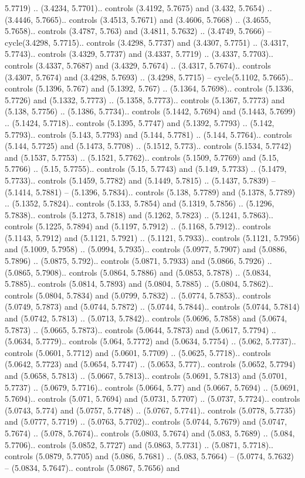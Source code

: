 5.7719) .. (3.4234, 5.7701).. controls (3.4192, 5.7675) and (3.432, 5.7654) .. (3.4446, 5.7665).. controls (3.4513, 5.7671) and (3.4606, 5.7668) .. (3.4655, 5.7658).. controls (3.4787, 5.763) and (3.4811, 5.7632) .. (3.4749, 5.7666) -- cycle(3.4298, 5.7715).. controls (3.4298, 5.7737) and (3.4307, 5.7751) .. (3.4317, 5.7743).. controls (3.4329, 5.7737) and (3.4337, 5.7719) .. (3.4337, 5.7703).. controls (3.4337, 5.7687) and (3.4329, 5.7674) .. (3.4317, 5.7674).. controls (3.4307, 5.7674) and (3.4298, 5.7693) .. (3.4298, 5.7715) -- cycle(5.1102, 5.7665).. controls (5.1396, 5.767) and (5.1392, 5.767) .. (5.1364, 5.7698).. controls (5.1336, 5.7726) and (5.1332, 5.7773) .. (5.1358, 5.7773).. controls (5.1367, 5.7773) and (5.138, 5.7756) .. (5.1386, 5.7734).. controls (5.1442, 5.7694) and (5.1443, 5.7699) .. (5.1424, 5.7718).. controls (5.1395, 5.7747) and (5.1392, 5.7793) .. (5.142, 5.7793).. controls (5.143, 5.7793) and (5.144, 5.7781) .. (5.144, 5.7764).. controls (5.144, 5.7725) and (5.1473, 5.7708) .. (5.1512, 5.773).. controls (5.1534, 5.7742) and (5.1537, 5.7753) .. (5.1521, 5.7762).. controls (5.1509, 5.7769) and (5.15, 5.7766) .. (5.15, 5.7755).. controls (5.15, 5.7743) and (5.149, 5.7733) .. (5.1479, 5.7733).. controls (5.1459, 5.7782) and (5.1449, 5.7815) .. (5.1437, 5.7839) -- (5.1414, 5.7881) -- (5.1396, 5.7834).. controls (5.138, 5.7789) and (5.1378, 5.7789) .. (5.1352, 5.7824).. controls (5.133, 5.7854) and (5.1319, 5.7856) .. (5.1296, 5.7838).. controls (5.1273, 5.7818) and (5.1262, 5.7823) .. (5.1241, 5.7863).. controls (5.1225, 5.7894) and (5.1197, 5.7912) .. (5.1168, 5.7912).. controls (5.1143, 5.7912) and (5.1121, 5.7921) .. (5.1121, 5.7933).. controls (5.1121, 5.7956) and (5.1009, 5.7958) .. (5.0994, 5.7935).. controls (5.0977, 5.7907) and (5.0886, 5.7896) .. (5.0875, 5.792).. controls (5.0871, 5.7933) and (5.0866, 5.7926) .. (5.0865, 5.7908).. controls (5.0864, 5.7886) and (5.0853, 5.7878) .. (5.0834, 5.7885).. controls (5.0814, 5.7893) and (5.0804, 5.7885) .. (5.0804, 5.7862).. controls (5.0804, 5.7834) and (5.0799, 5.7832) .. (5.0774, 5.7853).. controls (5.0749, 5.7873) and (5.0744, 5.7872) .. (5.0744, 5.7844).. controls (5.0744, 5.7814) and (5.0742, 5.7813) .. (5.0713, 5.7842).. controls (5.0696, 5.7858) and (5.0674, 5.7873) .. (5.0665, 5.7873).. controls (5.0644, 5.7873) and (5.0617, 5.7794) .. (5.0634, 5.7779).. controls (5.064, 5.7772) and (5.0634, 5.7754) .. (5.062, 5.7737).. controls (5.0601, 5.7712) and (5.0601, 5.7709) .. (5.0625, 5.7718).. controls (5.0642, 5.7723) and (5.0654, 5.7747) .. (5.0653, 5.777).. controls (5.0652, 5.7794) and (5.0658, 5.7813) .. (5.0667, 5.7813).. controls (5.0691, 5.7813) and (5.0701, 5.7737) .. (5.0679, 5.7716).. controls (5.0664, 5.77) and (5.0667, 5.7694) .. (5.0691, 5.7694).. controls (5.071, 5.7694) and (5.0731, 5.7707) .. (5.0737, 5.7724).. controls (5.0743, 5.774) and (5.0757, 5.7748) .. (5.0767, 5.7741).. controls (5.0778, 5.7735) and (5.0777, 5.7719) .. (5.0763, 5.7702).. controls (5.0744, 5.7679) and (5.0747, 5.7674) .. (5.078, 5.7674).. controls (5.0803, 5.7674) and (5.083, 5.7689) .. (5.084, 5.7706).. controls (5.0852, 5.7727) and (5.0863, 5.7731) .. (5.0871, 5.7718).. controls (5.0879, 5.7705) and (5.086, 5.7681) .. (5.083, 5.7664) -- (5.0774, 5.7632) -- (5.0834, 5.7647).. controls (5.0867, 5.7656) and 